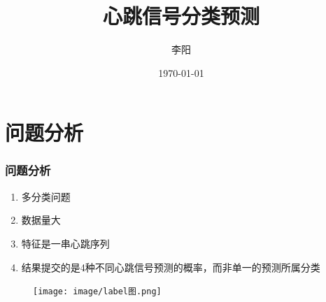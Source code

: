\documentclass[aspectratio=43, 12pt, utf8, mathserif]{ctexbeamer} %
\begin{document}
\title{\bf 心跳信号分类预测}
\author{李阳}
\date{\today}

\begin{frame}
    \titlepage    
\end{frame}


\section{问题分析}
\begin{frame}
    \frametitle{问题分析}
    \begin{minipage}[c]{0.5\linewidth}
        \begin{enumerate}
            \item 多分类问题
            \item 数据量大
            \item 特征是一串心跳序列
            \item 结果提交的是4种不同心跳信号预测的概率，而非单一的预测所属分类
        \end{enumerate}
    \end{minipage}\hspace{1cm}
    \begin{minipage}{0.3\linewidth}
        \medskip
        \begin{figure}[h]
            \centering
            \texttt{[image: image/label图.png]}
        \end{figure}
    \end{minipage}
\end{frame}
\end{document}
